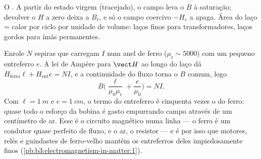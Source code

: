 \begin{omfigure}

{\small O . A partir do estado virgem (tracejado), o
campo leva o $B$ à saturação; devolver o $H$ a zero deixa a
 $B_{\text{r}}$, e só o campo coercivo
$-H_{\text{c}}$ a apaga. Área do laço = calor por ciclo por unidade de
volume: laços finos para transformadores, laços gordos para ímãs
permanentes.}
\end{omfigure}

\begin{example}\label{ex:b3:electromagnetism-in-matter:electromagnet}
Enrole $N$ espiras que carregam $I$ num anel de ferro ($\mu_{\text{r}}
\sim 5000$) com um pequeno entreferro $e$. A lei de Ampère para
$\vect H$ ao longo do laço dá $H_{\text{ferro}}\ell + H_{\text{ent}}e = NI$,
e a continuidade do fluxo torna o $B$ comum, logo
\[
B\Big(\frac{\ell}{\mu_0\mu_{\text{r}}} + \frac{e}{\mu_0}\Big) = NI .
\]
Com $\ell = \qty{1}{m}$ e $e = \qty{1}{cm}$, o termo do entreferro é
cinquenta vezes o do ferro: quase todo o esforço da bobina é gasto
empurrando campo através de um centímetro de ar. Esse é o circuito
magnético numa linha --- o ferro é um condutor quase perfeito de fluxo,
e o ar, o resistor --- e é por isso que motores, relés e guindastes de
ferro-velho mantêm os entreferros deles impiedosamente finos
(\cref{pb:b3:electromagnetism-in-matter:1}).
\end{example}

